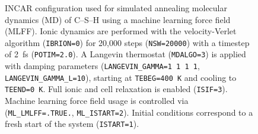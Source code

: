 \begin{figure}[H]
    \centering
    \begin{threeparttable}
        \caption{INCAR configuration used for simulated annealing molecular dynamics (MD) of C--S--H using a machine learning force field (MLFF). Ionic dynamics are performed with the velocity-Verlet algorithm (\texttt{IBRION=0}) for 20,000 steps (\texttt{NSW=20000}) with a timestep of 2~fs (\texttt{POTIM=2.0}). A Langevin thermostat (\texttt{MDALGO=3}) is applied with damping parameters (\texttt{LANGEVIN\_GAMMA=1 1 1 1}, \texttt{LANGEVIN\_GAMMA\_L=10}), starting at \texttt{TEBEG=400~K} and cooling to \texttt{TEEND=0~K}. Full ionic and cell relaxation is enabled (\texttt{ISIF=3}). Machine learning force field usage is controlled via (\texttt{ML\_LMLFF=.TRUE.}, \texttt{ML\_ISTART=2}). Initial conditions correspond to a fresh start of the system (\texttt{ISTART=1}).}
        \label{fig:incar_md_cement_parallel}
\end{threeparttable}
\end{figure}
